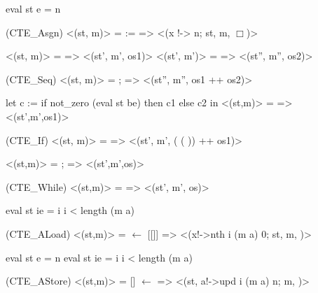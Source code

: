 \documentclass[12pt]{report}
\begin{document}
                          eval st e = n
\par
\noindent\hrulefill\par
\noindent{}    (CTE\_Asgn)
      <(st, m)> =  :=  => <(x !-> n; st, m, \ensuremath{\Box})>


            <(st, m)> =  => <(st', m', os1)>
            <(st', m')> =  => <(st'', m'', os2)>
\par
\noindent\hrulefill\par
\noindent{}   (CTE\_Seq)
      <(st, m)>  =  ;  => <(st'', m'', os1 ++ os2)>


       let c := if not\_zero (eval st be) then c1 else c2 in
            <(st,m)> =  => <(st',m',os1)>
\par
\noindent\hrulefill\par
\noindent{} (CTE\_If)
  <(st, m)> =       =>
   <(st', m',  ( (  )) ++ os1)>


<(st,m)> =    ;         => <(st',m',os)>
\par
\noindent\hrulefill\par
\noindent{} (CTE\_While)
            <(st,m)> =      => <(st', m', os)>


              eval st ie = i              i < length (m a)
\par
\noindent\hrulefill\par
\noindent{} (CTE\_ALoad)
<(st,m)> =  \ensuremath{\leftarrow} [[]] => <(x!->nth i (m a) 0; st, m,  )>


   eval st e = n     eval st ie = i    i < length (m a)
\par
\noindent\hrulefill\par
\noindent{}   (CTE\_AStore)
<(st,m)> = [] \ensuremath{\leftarrow}  => <(st, a!->upd i (m a) n; m,  )>
\end{document}

